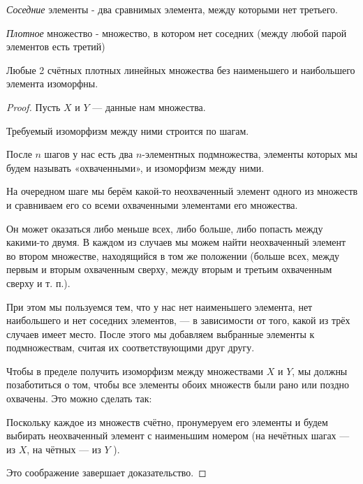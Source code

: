 \begin{definition} \thmslashn

	\textit{Соседние} элементы - два сравнимых элемента, между которыми нет третьего.
	
	\textit{Плотное} множество - множество, в котором нет соседних (между любой парой элементов есть третий)
\end{definition}

\begin{theorem} \thmslashn

	Любые 2 счётных плотных линейных множества без наименьшего и наибольшего элемента изоморфны.
	\begin{proof} \thmslashn
		
		Пусть $X$ и $Y$ — данные нам множества.
        
        Требуемый изоморфизм между ними строится по шагам.
        
        После $n$ шагов у нас есть два $n$-элементных подмножества, элементы которых мы будем называть «охваченными», и изоморфизм между ними. 
		
        На очередном шаге мы берём какой-то неохваченный элемент одного из множеств и сравниваем его со всеми охваченными элементами его множества. 
        
        Он может оказаться либо меньше всех, либо больше, либо попасть между какими-то двумя. В каждом из случаев мы можем	найти неохваченный элемент во втором множестве, находящийся в том же положении (больше всех, между первым и вторым охваченным сверху, между  вторым и третьим охваченным сверху и т. п.). 
        
        При этом мы пользуемся тем, что у нас нет наименьшего элемента, нет наибольшего и нет соседних элементов, — в зависимости от того, какой из трёх случаев имеет место. 
        После этого мы добавляем выбранные элементы к подмножествам, считая их соответствующими друг другу.

		Чтобы в пределе получить изоморфизм между множествами $X$ и $Y$, мы должны позаботиться о том, чтобы все элементы обоих множеств были рано или поздно охвачены. Это можно сделать так:

		Поскольку каждое из множеств счётно, пронумеруем его элементы и будем выбирать неохваченный элемент с наименьшим номером (на нечётных шагах — из $X$, на чётных — из $Y$ ). 
        
        Это соображение завершает доказательство.
	\end{proof}
\end{theorem}

